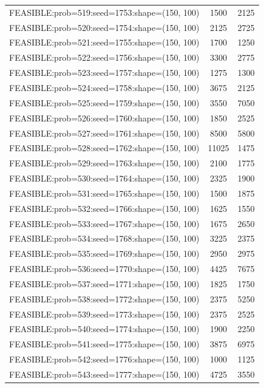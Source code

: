 \begin{longtable}{lcc}
FEASIBLE:prob=519:seed=1753:shape=(150, 100) &     1500 &  2125 \\
FEASIBLE:prob=520:seed=1754:shape=(150, 100) &     2125 &  2725 \\
FEASIBLE:prob=521:seed=1755:shape=(150, 100) &     1700 &  1250 \\
FEASIBLE:prob=522:seed=1756:shape=(150, 100) &     3300 &  2775 \\
FEASIBLE:prob=523:seed=1757:shape=(150, 100) &     1275 &  1300 \\
FEASIBLE:prob=524:seed=1758:shape=(150, 100) &     3675 &  2125 \\
FEASIBLE:prob=525:seed=1759:shape=(150, 100) &     3550 &  7050 \\
FEASIBLE:prob=526:seed=1760:shape=(150, 100) &     1850 &  2525 \\
FEASIBLE:prob=527:seed=1761:shape=(150, 100) &     8500 &  5800 \\
FEASIBLE:prob=528:seed=1762:shape=(150, 100) &    11025 &  1475 \\
FEASIBLE:prob=529:seed=1763:shape=(150, 100) &     2100 &  1775 \\
FEASIBLE:prob=530:seed=1764:shape=(150, 100) &     2325 &  1900 \\
FEASIBLE:prob=531:seed=1765:shape=(150, 100) &     1500 &  1875 \\
FEASIBLE:prob=532:seed=1766:shape=(150, 100) &     1625 &  1550 \\
FEASIBLE:prob=533:seed=1767:shape=(150, 100) &     1675 &  2650 \\
FEASIBLE:prob=534:seed=1768:shape=(150, 100) &     3225 &  2375 \\
FEASIBLE:prob=535:seed=1769:shape=(150, 100) &     2950 &  2975 \\
FEASIBLE:prob=536:seed=1770:shape=(150, 100) &     4425 &  7675 \\
FEASIBLE:prob=537:seed=1771:shape=(150, 100) &     1825 &  1750 \\
FEASIBLE:prob=538:seed=1772:shape=(150, 100) &     2375 &  5250 \\
FEASIBLE:prob=539:seed=1773:shape=(150, 100) &     2375 &  2525 \\
FEASIBLE:prob=540:seed=1774:shape=(150, 100) &     1900 &  2250 \\
FEASIBLE:prob=541:seed=1775:shape=(150, 100) &     3875 &  6975 \\
FEASIBLE:prob=542:seed=1776:shape=(150, 100) &     1000 &  1125 \\
FEASIBLE:prob=543:seed=1777:shape=(150, 100) &     4725 &  3550 \\

\end{longtable}
